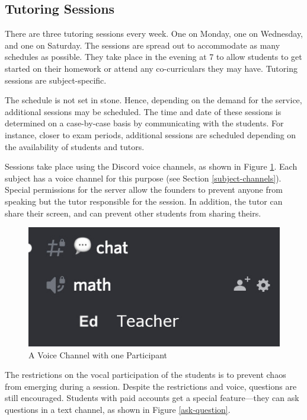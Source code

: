 \documentclass{business}
\begin{document}
    \subsection{Tutoring Sessions}
    There are three tutoring sessions every week. One on Monday, one on Wednesday, and one on Saturday. The sessions are spread out to accommodate as many schedules as possible. They take place in the evening at 7 to allow students to get started on their homework or attend any co-curriculars they may have. Tutoring sessions are subject-specific.\par
    The schedule is not set in stone. Hence, depending on the demand for the service, additional sessions may be scheduled. The time and date of these sessions is determined on a case-by-case basis by communicating with the students. For instance, closer to exam periods, additional sessions are scheduled depending on the availability of students and tutors.\par
    Sessions take place using the Discord voice channels, as shown in Figure \ref{teacher-vc}. Each subject has a voice channel for this purpose (see Section \ref{subject-channels}). Special permissions for the server allow the founders to prevent anyone from speaking but the tutor responsible for the session. In addition, the tutor can share their screen, and can prevent other students from sharing theirs.
    \begin{figure}[H]
        \centering
        \caption{A Voice Channel with one Participant}
        \label{teacher-vc}
        \includegraphics[scale=0.5]{images/teacher-vc.jpg}
    \end{figure}
    The restrictions on the vocal participation of the students is to prevent chaos from emerging during a session. Despite the restrictions and voice, questions are still encouraged. Students with paid accounts get a special feature––they can ask questions in a text channel, as shown in Figure \ref{ask-question}.
\end{document}

